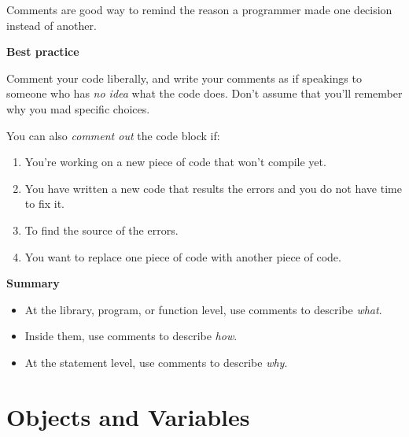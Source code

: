 \documentclass[
  letterpaper,
  DIV=11,
  numbers=noendperiod]{scrreprt}
\providecommand{\tightlist}{%
  \setlength{\itemsep}{0pt}\setlength{\parskip}{0pt}}\usepackage{longtable,booktabs,array}
\begin{document}
Comments are good way to remind the reason a programmer made one
decision instead of another.

\begin{tcolorbox}[enhanced jigsaw, toprule=.15mm, rightrule=.15mm, opacityback=0, breakable, leftrule=.75mm, colback=white, colframe=quarto-callout-tip-color-frame, arc=.35mm, left=2mm, bottomrule=.15mm]
\begin{minipage}[t]{5.5mm}
\textcolor{quarto-callout-tip-color}{\faLightbulb}
\end{minipage}%
\begin{minipage}[t]{\textwidth - 5.5mm}

\textbf{Best practice}\vspace{2mm}

Comment your code liberally, and write your comments as if speakings to
someone who has \emph{no idea} what the code does. Don't assume that
you'll remember why you mad specific choices.

\end{minipage}%
\end{tcolorbox}

You can also \emph{comment out} the code block if:

\begin{enumerate}
\def\labelenumi{\arabic{enumi}.}
\tightlist
\item
  You're working on a new piece of code that won't compile yet.
\item
  You have written a new code that results the errors and you do not
  have time to fix it.
\item
  To find the source of the errors.
\item
  You want to replace one piece of code with another piece of code.
\end{enumerate}

\textbf{Summary}

\begin{itemize}
\tightlist
\item
  At the library, program, or function level, use comments to describe
  \emph{what}.
\item
  Inside them, use comments to describe \emph{how}.
\item
  At the statement level, use comments to describe \emph{why}.
\end{itemize}

\hypertarget{sec-intro_var}{%
\section{Objects and Variables}\label{sec-intro_var}}
\end{document}
